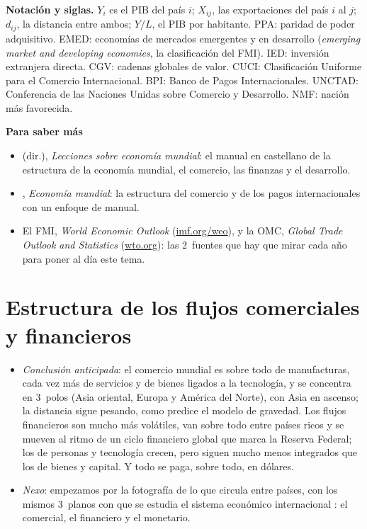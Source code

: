 \documentclass[11pt]{article}
\begin{document}
\begin{anotaciones}
\textbf{Notación y siglas.} $Y_i$ es el PIB del país $i$; $X_{ij}$, las exportaciones del país $i$ al $j$; $d_{ij}$, la distancia entre ambos; $Y/L$, el PIB por habitante. PPA: paridad de poder adquisitivo. EMED: economías de mercados emergentes y en desarrollo (\emph{emerging market and developing economies}, la clasificación del FMI). IED: inversión extranjera directa. CGV: cadenas globales de valor. CUCI: Clasificación Uniforme para el Comercio Internacional. BPI: Banco de Pagos Internacionales. UNCTAD: Conferencia de las Naciones Unidas sobre Comercio y Desarrollo. NMF: nación más favorecida.
\end{anotaciones}

\begin{anotaciones}
\textbf{Para saber más}
\begin{itemize}
\item {} (dir.), \emph{Lecciones sobre economía mundial}: el manual en castellano de la estructura de la economía mundial, el comercio, las finanzas y el desarrollo\nocite{Alonso2019Lecciones}.
\item {}, \emph{Economía mundial}: la estructura del comercio y de los pagos internacionales con un enfoque de manual\nocite{Requeijo2012Economia}.
\item El FMI, \emph{World Economic Outlook} (\href{https://www.imf.org/en/publications/weo}{imf.org/weo}), y la OMC, \emph{Global Trade Outlook and Statistics} (\href{https://www.wto.org/english/res_e/statis_e/statis_e.htm}{wto.org}): las 2~fuentes que hay que mirar cada año para poner al día este tema.
\end{itemize}
\end{anotaciones}

\section{Estructura de los flujos comerciales y financieros}\label{sec:flujos}

\begin{itemize}
\item \emph{Conclusión anticipada}: el comercio mundial es sobre todo de manufacturas, cada vez más de servicios y de bienes ligados a la tecnología, y se concentra en 3~polos (Asia oriental, Europa y América del Norte), con Asia en ascenso; la distancia sigue pesando, como predice el modelo de gravedad. Los flujos financieros son mucho más volátiles, van sobre todo entre países ricos y se mueven al ritmo de un ciclo financiero global que marca la Reserva Federal; los de personas y tecnología crecen, pero siguen mucho menos integrados que los de bienes y capital. Y todo se paga, sobre todo, en dólares.
\item \emph{Nexo}: empezamos por la fotografía de lo que circula entre países, con los mismos 3~planos con que se estudia el sistema económico internacional  : el comercial, el financiero y el monetario.
\end{itemize}
\end{document}
